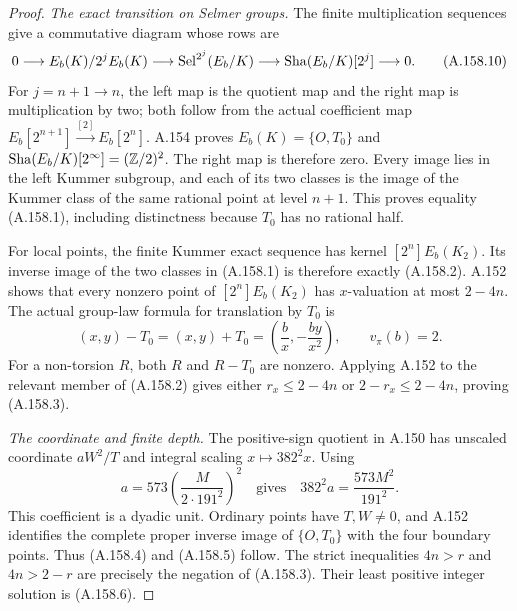 \begin{proof}
\emph{The exact transition on Selmer groups.}
The finite multiplication sequences give a commutative diagram
whose rows are
\[
 0\longrightarrow E_b(K)/2^jE_b(K)
 \longrightarrow\operatorname{Sel}^{2^j}(E_b/K)
 \longrightarrow\operatorname{Sha}(E_b/K)[2^j]\longrightarrow0.
\tag{A.158.10}
\]
For \(j=n+1\to n\), the left map is the quotient map and
the right map is multiplication by two; both follow from
the actual coefficient map \(E_b[2^{n+1}]\xrightarrow{[2]}
E_b[2^n]\).
A.154 proves
\(E_b(K)=\{O,T_0\}\) and
\(\operatorname{Sha}(E_b/K)[2^\infty]=(\mathbb Z/2)^2\).
The right map is therefore zero.  Every image lies in the
left Kummer subgroup, and each of its two classes is the
image of the Kummer class of the same rational point at
level \(n+1\).  This proves equality (A.158.1), including
distinctness because \(T_0\) has no rational half.

For local points, the finite Kummer exact sequence has
kernel \([2^n]E_b(K_2)\).  Its inverse image of the two
classes in (A.158.1) is therefore exactly (A.158.2).
A.152 shows that every nonzero point of
\([2^n]E_b(K_2)\) has \(x\)-valuation at most \(2-4n\).
The actual group-law formula for translation by \(T_0\) is
\[
 (x,y)-T_0=(x,y)+T_0
       =\left(\frac b{x},-\frac{by}{x^2}\right),
 \qquad v_\pi(b)=2.
\tag{A.158.11}
\]
For a non-torsion \(R\), both \(R\) and \(R-T_0\) are
nonzero.  Applying A.152 to the relevant member of
(A.158.2) gives either \(r_x\leq2-4n\) or
\(2-r_x\leq2-4n\), proving (A.158.3).

\emph{The coordinate and finite depth.}
The positive-sign quotient in A.150 has unscaled coordinate
\(aW^2/T\) and integral scaling \(x\mapsto382^2x\).
Using
\[
       a=573\left(\frac{M}{2\cdot191^2}\right)^2
 \quad\text{gives}\quad
       382^2a=\frac{573M^2}{191^2}.
\tag{A.158.12}
\]
This coefficient is a dyadic unit.  Ordinary points have
\(T,W\ne0\), and A.152 identifies the complete proper
inverse image of \(\{O,T_0\}\) with the four boundary
points.  Thus (A.158.4) and (A.158.5) follow.
The strict inequalities
\(4n>r\) and \(4n>2-r\) are precisely the negation of
(A.158.3).  Their least positive integer solution is
(A.158.6).


\end{proof}
